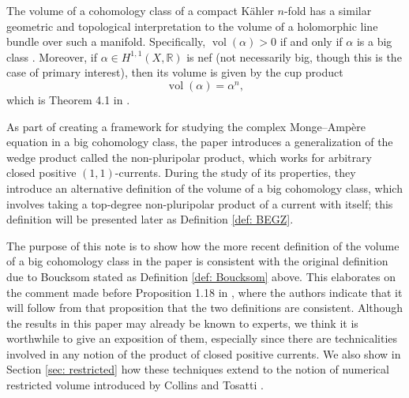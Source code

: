 \documentclass[a4paper]{amsart}
\newcommand{\R}{\mathbb{R}}
\newcommand{\vol}{\operatorname{vol}}
\theoremstyle{definition}
\begin{document}
The volume of a cohomology class of a compact K\"ahler $n$-fold has a similar geometric and topological interpretation to the volume of a holomorphic line bundle over such a manifold. Specifically, $\vol(\alpha) >0$ if and only if $\alpha$ is a big class \cite[Theorem 4.7]{Boucksom}. Moreover, if $\alpha \in H^{1, 1}(X, \R)$ is nef (not necessarily big, though this is the case of primary interest), then its volume is given by the cup product
\[\vol(\alpha) = \alpha^n,\]
which is Theorem 4.1 in \cite{Boucksom}. 

As part of creating a framework for studying the complex Monge--Amp\`ere equation in a big cohomology class, the paper \cite{BEGZ} introduces a generalization of the wedge product called the non-pluripolar product, which works for arbitrary closed positive $(1, 1)$-currents. During the study of its properties, they introduce an alternative definition of the volume of a big cohomology class, which involves taking a top-degree non-pluripolar product of a current with itself; this definition will be presented later as Definition \ref{def: BEGZ}.

The purpose of this note is to show how the more recent definition of the volume of a big cohomology class in the paper \cite{BEGZ} is consistent with the original definition due to Boucksom \cite{Boucksom} stated as Definition \ref{def: Boucksom} above. This elaborates on the comment made before Proposition 1.18 in \cite{BEGZ}, where the authors indicate that it will follow from that proposition that the two definitions are consistent. Although the results in this paper may already be known to experts, we think it is worthwhile to give an exposition of them, especially since there are technicalities involved in any notion of the product of closed positive currents. We also show in Section \ref{sec: restricted} how these techniques extend to the notion of numerical restricted volume introduced by Collins and Tosatti \cite{RestrictedVol}.
\end{document}
